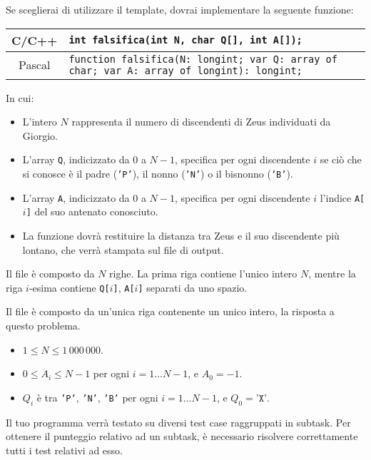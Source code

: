 Se sceglierai di utilizzare il template, dovrai implementare la seguente funzione:
\begin{center}\begin{tabularx}{\textwidth}{|c|X|}
\hline
C/C++  & \verb|int falsifica(int N, char Q[], int A[]);|\\
\hline
Pascal & \footnotesize\verb|function falsifica(N: longint; var Q: array of char; var A: array of longint): longint;|\\
\hline
\end{tabularx}\end{center}
In cui:
\begin{itemize}[nolistsep]
  \item L'intero $N$ rappresenta il numero di discendenti di Zeus individuati da Giorgio.
  \item L'array \texttt{Q}, indicizzato da $0$ a $N-1$, specifica per ogni discendente $i$ se ciò che si conosce è il padre (\texttt{'P'}), il nonno (\texttt{'N'}) o il bisnonno (\texttt{'B'}).
  \item L'array \texttt{A}, indicizzato da $0$ a $N-1$, specifica per ogni discendente $i$ l'indice \texttt{A[$i$]} del suo antenato conosciuto.
  \item La funzione dovrà restituire la distanza tra Zeus e il suo discendente più lontano, che verrà stampata sul file di output.
\end{itemize}

\InputFile
Il file  è composto da $N$ righe. La prima riga contiene l'unico intero $N$, mentre la riga $i$-esima contiene \texttt{Q[$i$]}, \texttt{A[$i$]}
separati da uno spazio.

\OutputFile
Il file \outputfile{} è composto da un'unica riga contenente un unico intero, la risposta a questo problema.

\Constraints
\begin{itemize}[nolistsep, itemsep=2mm]
	\item $1 \le N \le 1\,000\,000$.
	\item $0 \le A_i \le N-1$ per ogni $i=1\ldots N-1$, e $A_0 = -1$.
	\item $Q_i$ è tra \texttt{'P'}, \texttt{'N'}, \texttt{'B'} per ogni $i=1\ldots N-1$, e $Q_0 = \texttt{'X'}$.
\end{itemize}

\Scoring
Il tuo programma verrà testato su diversi test case raggruppati in subtask.
Per ottenere il punteggio relativo ad un subtask, è necessario risolvere
correttamente tutti i test relativi ad esso.

